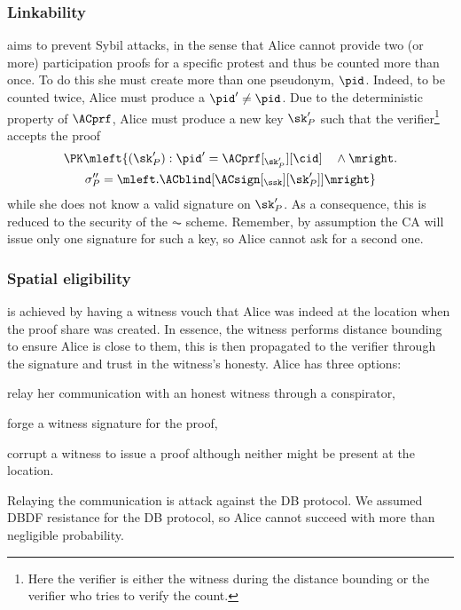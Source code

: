 \subsubsection{Linkability}%
\label{analysis-linkability}

 aims to prevent Sybil attacks, in the sense
that Alice cannot provide two (or more) participation proofs for a
specific protest and thus be counted more than once.
To do this she must create more than one pseudonym, \(\pid\).
Indeed, to be counted twice, Alice must produce a \(\pid'\neq \pid\).
Due to the deterministic property of \(\ACprf\), Alice must produce a new key 
\(\sk_P'\) such that the verifier\footnote{%
  Here the verifier is either the witness during the distance bounding or the 
  verifier who tries to verify the count.
} accepts the proof
\begin{multline*}
\PK\mleft\{ (\sk_P') : \pid' = \ACprf[_{\sk_P'}][\cid] \quad \land \mright. \\
    \sigma_P'' = \mleft. \ACblind[\ACsign[_{\ssk}][\sk_P']] \mright\}
\end{multline*}
while she does not know a valid signature on \(\sk_P'\).
As a consequence, this is reduced to the security of the \(\AC\) scheme.
Remember, by assumption the \ac{CA} will issue only one signature for such a 
key, so Alice cannot ask for a second one.

\subsubsection{Spatial eligibility}%
\label{analysis-spatial}

 is achieved by having a witness vouch that Alice was 
indeed at the location when the proof share was created.
In essence, the witness performs distance bounding to ensure Alice is close to 
them, this is then propagated to the verifier through the signature and trust 
in the witness's honesty.
Alice has three options:
\begin{enumerate*}
\item\label{spatial-DF} relay her communication with an honest witness through 
  a conspirator,
\item\label{spatial-forge} forge a witness signature for the proof,
\item corrupt a witness to issue a proof although neither might be present at 
  the location.
\end{enumerate*}

Relaying the communication is  attack against the \ac{DB} protocol.
We assumed \ac{DBDF} resistance for the \ac{DB} protocol, so Alice cannot 
succeed with more than negligible probability.
 
